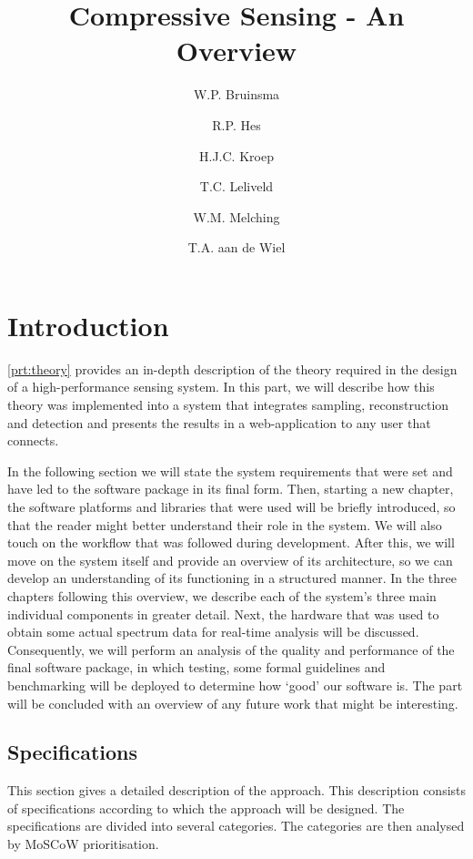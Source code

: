 \documentclass[a4paper, openany, oneside]{memoir}
\title{Compressive Sensing - An Overview}
\author{W.P. Bruinsma \and R.P. Hes \and H.J.C. Kroep \and T.C. Leliveld \and W.M. Melching \and T.A. aan de Wiel}
\begin{document}
\chapter{Introduction}
\cref{prt:theory} provides an in-depth description of the theory required in the design of a high-performance sensing system.
In this part, we will describe how this theory was implemented into a system that integrates sampling, reconstruction and detection and presents the results in a web-application to any user that connects.

In the following section we will state the system requirements that were set and have led to the software package in its final form. Then, starting a new chapter, the software platforms and libraries that were used will be briefly introduced, so that the reader might better understand their role in the system. We will also touch on the workflow that was followed during development. After this, we will move on the system itself and provide an overview of its architecture, so we can develop an understanding of its functioning in a structured manner. In the three chapters following this overview, we describe each of the system's three main individual components in greater detail. Next, the hardware that was used to obtain some actual spectrum data for real-time analysis will be discussed. Consequently, we will perform an analysis of the quality and performance of the final software package, in which testing, some formal guidelines and benchmarking will be deployed to determine how `good' our software is. The part will be concluded with an overview of any future work that might be interesting.

\section{Specifications}
\label{sec:implementation-specs}
This section gives a detailed description of the approach. This description consists of specifications according to which the approach will be designed. The specifications are divided into several categories. The categories are then analysed by MoSCoW prioritisation.
\end{document}
